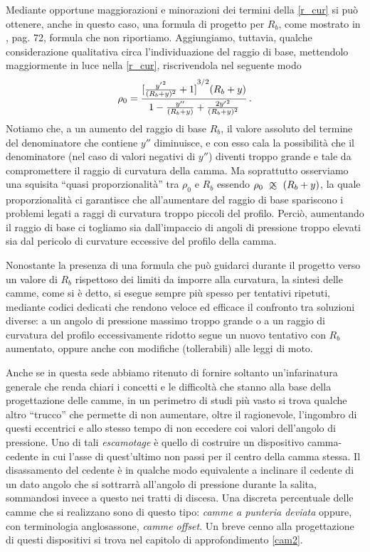 \noindent Mediante opportune maggiorazioni e minorazioni dei termini della
\ref{r_cur} si pu\`o ottenere, anche in questo caso, 
una formula di progetto per $R_b$, come mostrato in \cite{ruggieri}, pag. 72, formula che non riportiamo.
Aggiungiamo, tuttavia, qualche considerazione
qualitativa circa l'individuazione del raggio di base, mettendolo maggiormente
in luce nella \ref{r_cur}, riscrivendola nel seguente modo
\begin{equation}
\rho_0={{{{[{{y'}^2\over{(R_b + y)^2}}+1]}^{3/2}(R_b+y)}\over{{1-{y''\over{(R_b + y)}}} +{2{y'}^2\over{(R_b + y)^2}}}}}\,.
\label{r_cur1}
\end{equation}
\noindent Notiamo che, a un aumento del raggio di base $R_b$, il valore assoluto del 
termine del denominatore che contiene $y''$
diminuisce, e con esso
cala la possibilit\`a che il denominatore (nel caso di valori negativi di
$y''$) diventi troppo grande e tale da compromettere il 
raggio di curvatura della camma.
Ma soprattutto osserviamo una squisita ``quasi proporzionalit\`a''
tra $\rho_0$ e $R_b$ essendo $\rho_0\approxprop (R_b +y)$, la quale proporzionalit\`a ci garantisce che all'aumentare del raggio di base spariscono
i problemi legati a raggi di curvatura troppo piccoli del profilo.
Perci\`o, aumentando il raggio di base ci togliamo
sia dall'impaccio di angoli di pressione troppo elevati
sia dal pericolo di curvature eccessive del profilo della camma.


\noindent Nonostante la presenza di una formula che pu\`o guidarci
durante il progetto verso un valore di $R_b$ rispettoso dei limiti da imporre
alla curvatura,
la sintesi delle camme, come si \`e detto, si esegue sempre pi\`u spesso 
per tentativi ripetuti, mediante codici dedicati
che rendono veloce ed efficace il confronto tra soluzioni diverse: a un angolo di
pressione massimo troppo grande o a un raggio di curvatura del profilo eccessivamente
ridotto segue un nuovo tentativo con $R_b$ aumentato, oppure anche con modifiche
(tollerabili) alle leggi di moto.

\noindent Anche se in questa sede abbiamo ritenuto 
di fornire soltanto un'infarinatura generale che
renda chiari i concetti e le difficolt\`a che stanno alla base della progettazione
delle camme, in un perimetro di studi pi\`u vasto si trova qualche
altro ``trucco'' che permette
di non aumentare, oltre il ragionevole, l'ingombro di questi eccentrici e allo stesso
tempo di non eccedere coi valori dell'angolo di pressione. 
Uno di tali {\em escamotage} \`e quello di costruire un dispositivo camma-cedente in cui
l'asse di quest'ultimo non passi per il centro della camma stessa.
Il disassamento del cedente \`e in qualche modo equivalente a inclinare il cedente di un dato angolo che 
si sottrarr\`a all'angolo di pressione durante la salita, sommandosi invece a
questo nei tratti di discesa. Una discreta percentuale delle camme
che si realizzano sono di questo tipo: {\em camme a punteria deviata} oppure, con terminologia anglosassone,
{\em camme offset}.
Un breve cenno alla progettazione di questi dispositivi si trova nel
capitolo di approfondimento \ref{cam2}.

